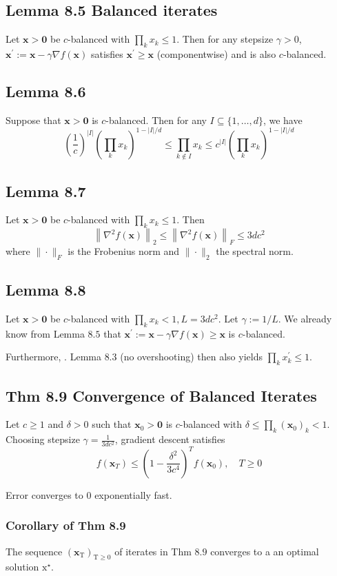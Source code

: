 \subsection*{Lemma 8.5 Balanced iterates}
Let $\mathbf{x}>\mathbf{0}$ be $c$-balanced with $\prod_{k} x_{k} \leq 1$. Then for any stepsize $\gamma>0$,
$\mathbf{x}^{\prime}:=\mathbf{x}-\gamma \nabla f(\mathbf{x})$ satisfies $\mathbf{x}^{\prime} \geq \mathbf{x}$ (componentwise) and is also $c$-balanced.




\subsection*{Lemma 8.6}
Suppose that $\mathbf{x}>\mathbf{0}$ is $c$-balanced. Then for any $I \subseteq\{1, \ldots, d\}$, we have
$$
\left(\frac{1}{c}\right)^{|I|}\left(\prod_{k} x_{k}\right)^{1-|I| / d} \leq \prod_{k \notin I} x_{k} \leq c^{|I|}\left(\prod_{k} x_{k}\right)^{1-|I| / d}
$$





\subsection*{Lemma 8.7}
Let $\mathbf{x}>\mathbf{0}$ be $c$-balanced with $\prod_{k} x_{k} \leq 1$. Then
$$
\left\|\nabla^{2} f(\mathbf{x})\right\|_2 \leq\left\|\nabla^{2} f(\mathbf{x})\right\|_{F} \leq 3 d c^{2}
$$
where $\|\cdot\|_{F}$ is the Frobenius norm and $\|\cdot\|_2$ the spectral norm.




\subsection*{Lemma 8.8}
Let $\mathbf{x}>\mathbf{0}$ be $c$-balanced with $\prod_{k} x_{k}<1, L=3 d c^{2}$. Let $\gamma:=1 / L$. We already know from Lemma $8.5$ that
$
\mathbf{x}^{\prime}:=\mathbf{x}-\gamma \nabla f(\mathbf{x}) \geq \mathbf{x}
$
is $c$-balanced. 

Furthermore, . Lemma $8.3$ (no overshooting) then also yields $\prod_{k} x_{k}^{\prime} \leq 1$.




\subsection*{Thm 8.9 Convergence of Balanced Iterates}
Let $c \geq 1$ and $\delta>0$ such that $\mathbf{x}_{0}>\mathbf{0}$ is $c$-balanced with $\delta \leq \prod_{k}\left(\mathbf{x}_{0}\right)_{k}<1$. Choosing stepsize
$
\gamma=\frac{1}{3 d c^{2}}
$, gradient descent satisfies
$$
f\left(\mathbf{x}_{T}\right) \leq\left(1-\frac{\delta^{2}}{3 c^{4}}\right)^{T} f\left(\mathbf{x}_{0}\right), \quad T \geq 0
$$

Error converges to 0 exponentially fast.


\subsubsection*{Corollary of Thm 8.9}
The sequence $\left(\mathbf{x}_{\mathrm{T}}\right)_{\mathrm{T} \geq 0}$ of iterates in Thm $8.9$ converges to a an optimal solution $\mathrm{x}^{\star}$.